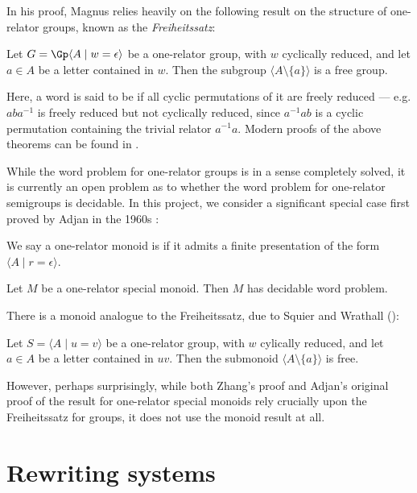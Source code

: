 \documentclass[showlabels,noindex,12pt]{lmaths}
\begin{document}
In his proof, Magnus relies heavily on the following result on the structure of one-relator groups, known as the \emph{Freiheitssatz}:

\begin{theorem}[Freiheitssatz] \label{thm:freiheitssatz}
	Let $G = \Gp \langle A \mid w = \epsilon \rangle$ be a one-relator group, with $w$ cyclically reduced, and let $a \in A$ be a letter contained in $w$. Then the subgroup $\langle A \setminus \{a\} \rangle$ is a free group.
\end{theorem}

Here, a word is said to be  if all cyclic permutations of it are freely reduced --- e.g. $aba^{-1}$ is freely reduced but not cyclically reduced, since $a^{-1}ab$ is a cyclic permutation containing the trivial relator $a^{-1}a$. Modern proofs of the above theorems can be found in \cite{Lyndon2001}.

While the word problem for one-relator groups is in a sense completely solved, it is currently an open problem as to whether the word problem for one-relator semigroups is decidable. In this project, we consider a significant special case first proved by Adjan in the 1960s \cite{Adian1966}:

\begin{defn}
We say a one-relator monoid is  if it admits a finite presentation of the form $\langle A \mid r = \epsilon \rangle$.
\end{defn}

\begin{theorem}[Adjan]
	Let $M$ be a one-relator special monoid. Then $M$ has decidable word problem.
\end{theorem}

There is a monoid analogue to the Freiheitssatz, due to Squier and Wrathall (\cite{Squier1983}):
\begin{theorem}
	Let $S = \langle A \mid u = v \rangle$ be a one-relator group, with $w$ cylically reduced, and let $a \in A$ be a letter contained in $uv$. Then the submonoid $\langle A \setminus \{a\} \rangle$ is free.
\end{theorem}
However, perhaps surprisingly, while both Zhang's proof and Adjan's original proof of the result for one-relator special monoids rely crucially upon the Freiheitssatz for groups, it does not use the monoid result at all.


\section{Rewriting systems} \label{sec:rewriting-systems}
\end{document}
